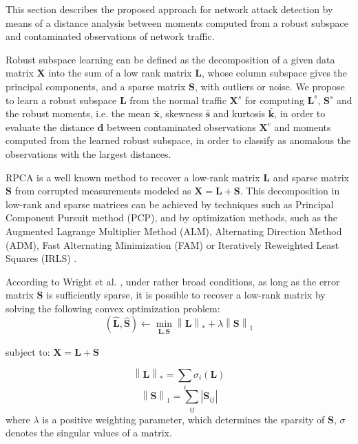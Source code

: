 This section describes the proposed approach for network attack detection by means of a distance analysis between moments computed from a robust subspace and contaminated observations of network traffic. 

Robust subspace learning can be defined as the decomposition of a given data matrix $\pmb{X}$ into the sum of a low rank matrix $\pmb{L}$, whose column subspace gives the principal components, and a sparse matrix $\pmb{S}$, with outliers or noise. We propose to learn a robust subspace $\pmb{L}$ from the normal traffic $\pmb{X}^s$ for computing $\pmb{L}^s$, $\pmb{S}^s$ and the robust moments, i.e. the mean $\bar{\pmb{x}}$, skewness $\bar{\pmb{s}}$ and kurtosis $\bar{\pmb{k}}$, in order to evaluate the distance $\pmb{d}$ between contaminated observations $\pmb{X}^c$ and moments computed from the learned robust subspace, in order to classify as anomalous the observations with the largest distances.

RPCA is a well known method to recover a low-rank matrix $\pmb{L}$ and sparse matrix $\pmb{S}$ from corrupted measurements modeled as $\pmb{X} = \pmb{L} + \pmb{S}$. This decomposition in low-rank and sparse matrices can be achieved by techniques such as Principal Component Pursuit method (PCP), and by optimization methods, such as the Augmented Lagrange Multiplier Method (ALM), Alternating Direction Method (ADM), Fast Alternating Minimization (FAM) or Iteratively Reweighted Least Squares (IRLS) \cite{candes2011robust,vaswani2018robust,lerman2018overview}.

According to Wright et al. \cite{wright2009robust}, under rather broad conditions, as long as the error matrix $\pmb{S}$ is sufficiently sparse, it is possible to recover a low-rank matrix by solving the following convex optimization problem:
\begin{equation}\label{eq:4.01}
	(\hat{\pmb{L}}, \hat{\pmb{S}})\leftarrow \min_{\pmb{L},\pmb{S}}\left \| \pmb{L} \right \|_{*} + \lambda \left \| \pmb{S} \right \|_{1}
\end{equation}
\begin{center} subject to: $\pmb{X} = \pmb{L} + \pmb{S}$ \end{center}
\begin{equation}\label{eq:4.02}
    \left \| \pmb{L} \right \|_{*} = \sum_{i} \sigma_{i}(\pmb{L})
\end{equation}
\begin{equation}\label{eq:4.03}
    \left \| \pmb{S} \right \|_{1} = \sum_{ij} \left | \pmb{S}_{ij} \right |
\end{equation}
where $\lambda$ is a positive weighting parameter, which determines the sparsity of $\pmb{S}$, $\sigma$ denotes the singular values of a matrix. 

